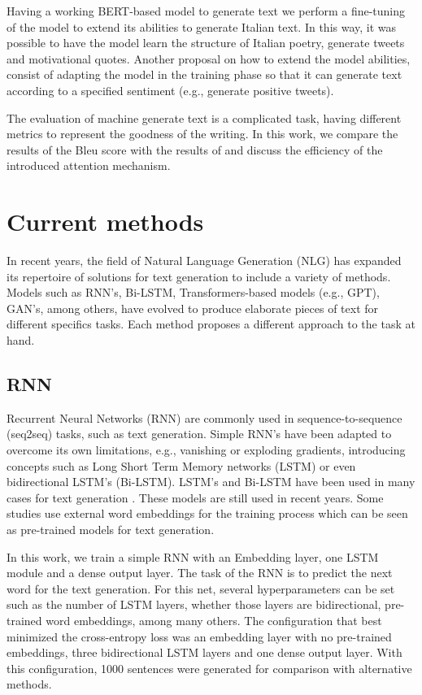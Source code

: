 \documentclass[10pt,twocolumn,letterpaper]{article}
\begin{document}
Having a working BERT-based model to generate text we perform a fine-tuning of the model
to extend its abilities to generate Italian text. In this way, it was possible to have the
model learn the structure of Italian poetry, generate tweets and motivational quotes.
Another proposal on how to extend the model abilities, consist of adapting the model in
the training phase so that it can generate text according to a specified sentiment
(e.g., generate positive tweets).

The evaluation of machine generate text is a complicated task, having different metrics
to represent the goodness of the writing. In this work, we compare the results of the Bleu
score with the results of \cite{wang2019bert} and discuss the efficiency of the introduced attention
mechanism.

\section{Current methods}

In recent years, the field of Natural Language Generation (NLG) has expanded its repertoire
of solutions for text generation to include a variety of methods.
Models such as RNN's, Bi-LSTM, Transformers-based models (e.g., GPT), GAN's, among others, have evolved
to produce elaborate pieces of text for different specifics tasks.
Each method proposes a different approach to the task at hand.

\subsection{RNN}

Recurrent Neural Networks (RNN) are commonly used in sequence-to-sequence (seq2seq) tasks, such as text generation.
Simple RNN's have been adapted to overcome its own limitations, e.g., vanishing or exploding gradients,
introducing concepts such as Long Short Term Memory networks (LSTM) or even bidirectional LSTM's (Bi-LSTM).
LSTM's and Bi-LSTM have been used in many cases for text generation \cite{Bengali} \cite{lstm1} \cite{lstm2} \cite{lstm3}.
These models are still used in recent years.
Some studies \cite{embedds} use external word embeddings for the training process which can be seen as pre-trained
models for text generation.

In this work, we train a simple RNN with an Embedding layer, one LSTM module and a dense output layer.
The task of the RNN is to predict the next word for the text generation.
For this net, several hyperparameters can be set such as the number of LSTM layers, whether those layers
are bidirectional, pre-trained word embeddings, among many others.
The configuration that best minimized the cross-entropy loss was an embedding layer with no pre-trained embeddings,
three bidirectional LSTM layers and one dense output layer.
With this configuration, 1000 sentences were generated for comparison with alternative methods.
\end{document}
